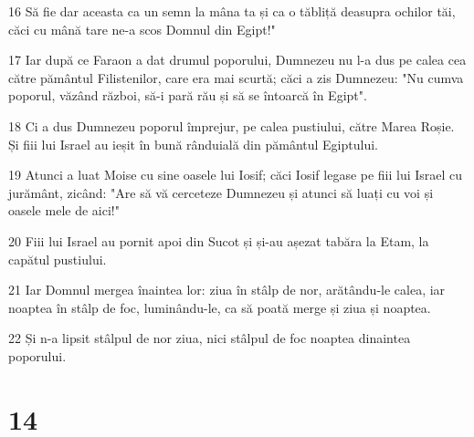 \par 16 Să fie dar aceasta ca un semn la mâna ta și ca o tăbliță deasupra ochilor tăi, căci cu mână tare ne-a scos Domnul din Egipt!"
\par 17 Iar după ce Faraon a dat drumul poporului, Dumnezeu nu l-a dus pe calea cea către pământul Filistenilor, care era mai scurtă; căci a zis Dumnezeu: "Nu cumva poporul, văzând război, să-i pară rău și să se întoarcă în Egipt".
\par 18 Ci a dus Dumnezeu poporul împrejur, pe calea pustiului, către Marea Roșie. Și fiii lui Israel au ieșit în bună rânduială din pământul Egiptului.
\par 19 Atunci a luat Moise cu sine oasele lui Iosif; căci Iosif legase pe fiii lui Israel cu jurământ, zicând: "Are să vă cerceteze Dumnezeu și atunci să luați cu voi și oasele mele de aici!"
\par 20 Fiii lui Israel au pornit apoi din Sucot și și-au așezat tabăra la Etam, la capătul pustiului.
\par 21 Iar Domnul mergea înaintea lor: ziua în stâlp de nor, arătându-le calea, iar noaptea în stâlp de foc, luminându-le, ca să poată merge și ziua și noaptea.
\par 22 Și n-a lipsit stâlpul de nor ziua, nici stâlpul de foc noaptea dinaintea poporului.

\chapter{14}

